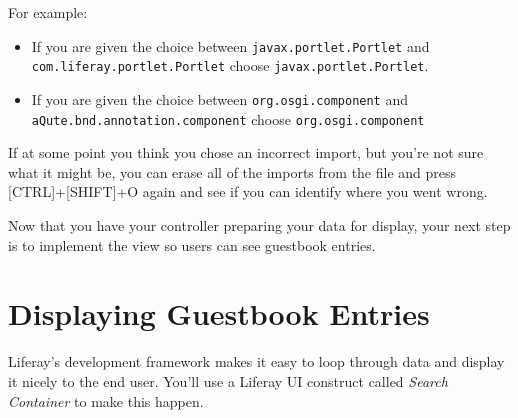 For example:

\begin{itemize}
\item
  If you are given the choice between \texttt{javax.portlet.Portlet} and
  \texttt{com.liferay.portlet.Portlet} choose
  \texttt{javax.portlet.Portlet}.
\item
  If you are given the choice between \texttt{org.osgi.component} and
  \texttt{aQute.bnd.annotation.component} choose
  \texttt{org.osgi.component}
\end{itemize}

If at some point you think you chose an incorrect import, but you're not
sure what it might be, you can erase all of the imports from the file
and press {[}CTRL{]}+{[}SHIFT{]}+O again and see if you can identify
where you went wrong.

\noindent\hrulefill

Now that you have your controller preparing your data for display, your
next step is to implement the view so users can see guestbook entries.

\section{Displaying Guestbook
Entries}\label{displaying-guestbook-entries-1}

Liferay's development framework makes it easy to loop through data and
display it nicely to the end user. You'll use a Liferay UI construct
called \emph{Search Container} to make this happen.

